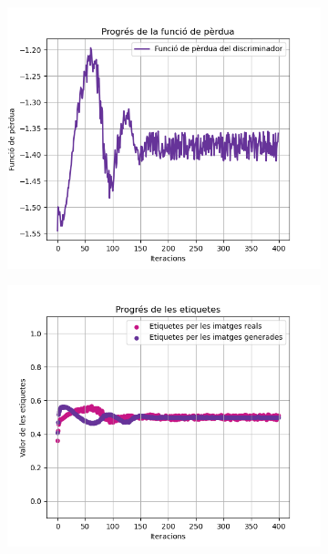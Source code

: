 \begin{figure}
	\label{fig:labels_loss_400}
	\begin{subfigure}{0.45\textwidth}
		\includegraphics[width=\linewidth]{figures/model/loss_plot.png}
		\caption{}
		\label{fig:loss_400}
	\end{subfigure}
	\begin{subfigure}{0.45\textwidth}
		\includegraphics[width=\linewidth]{figures/model/labels_plot.png}
		\caption{} \label{fig:labels_400}
	\end{subfigure}

\end{figure}
